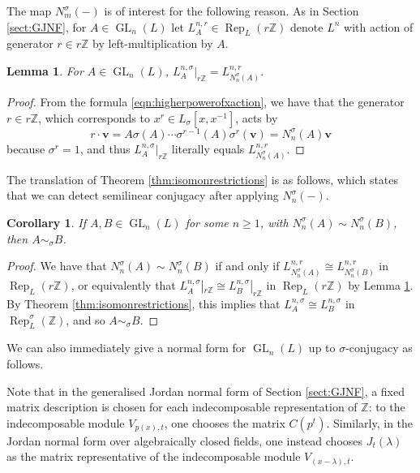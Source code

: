 \documentclass[10pt, reqno, hidelinks]{amsart}
\DeclareMathOperator{\Rep}{Rep}
\DeclareMathOperator{\GL}{GL}
\newcommand{\bZ}{{\mathbb Z}}
\numberwithin{thm}{subsection}
\newtheorem{lemma}[thm]{Lemma}
\newtheorem{cor}[thm]{Corollary}
\theoremstyle{definition}
\begin{document}
The map $N_m^{\sigma}(-)$ is of interest for the following reason. As in Section \ref{sect:GJNF}, for $A \in \GL_n(L)$ let $L^{n,r}_{A} \in \Rep_L(r \bZ)$ denote $L^n$ with action of generator $r \in r \bZ$ by left-multiplication by $A$.

\begin{lemma}\label{lem:explictrestriction}
	For $A \in \GL_n(L)$, $L^{n ,\sigma}_A|_{r \bZ} = L^{n,r}_{N_n^{\sigma}(A)}$.
\end{lemma}

\begin{proof}
	From the formula \eqref{eqn:higherpowerofxaction}, we have that the generator $r \in r \bZ$, which corresponds to $x^r \in L_{\sigma}[x,x^{-1}]$, acts by
	\[
	r \cdot \mathbf{v} = A \sigma(A) \cdots \sigma^{r-1}(A) \sigma^r(\mathbf{v}) = N_n^{\sigma}(A) \mathbf{v}
	\]
	because $\sigma^r = 1$, and thus $L^{n ,\sigma}_A|_{r \bZ}$ literally equals $L^{n,r}_{N_n^{\sigma}(A)}$.
\end{proof}

The translation of Theorem \ref{thm:isomonrestrictions} is as follows, which states that we can detect semilinear conjugacy after applying $N_n^{\sigma}(-)$.

\begin{cor}\label{cor:linsimimpliessim}
	If $A, B \in \GL_n(L)$ for some $n \geq 1$, with $N_n^{\sigma}(A) \sim N_n^{\sigma}(B)$, then $A \sim_{\sigma} B$.
\end{cor}

\begin{proof}
	We have that $N_n^{\sigma}(A) \sim N_n^{\sigma}(B)$ if and only if $L^{n,r}_{N_n^{\sigma}(A)} \cong L^{n,r}_{N_n^{\sigma}(B)}$ in $\Rep_L(r \bZ)$, or equivalently that $L^{n ,\sigma}_A|_{r \bZ} \cong L^{n ,\sigma}_B|_{r \bZ}$ in $\Rep_L(r \bZ)$ by Lemma \ref{lem:explictrestriction}. By Theorem \ref{thm:isomonrestrictions}, this implies that $L^{n ,\sigma}_A \cong L^{n ,\sigma}_B$ in $\Rep_L^{\sigma}(\bZ)$, and so $A \sim_{\sigma} B$.
\end{proof}

We can also immediately give a normal form for $\GL_n(L)$ up to $\sigma$-conjugacy as follows.

Note that in the generalised Jordan normal form of Section \ref{sect:GJNF}, a fixed matrix description is chosen for each indecomposable representation of $\bZ$: to the indecomposable module $V_{p(x),t}$, one chooses the matrix $C(p^t)$. Similarly, in the Jordan normal form over algebraically closed fields, one instead chooses $J_t(\lambda)$ as the matrix representative of the indecomposable module $V_{(x - \lambda), t}$.
\end{document}
